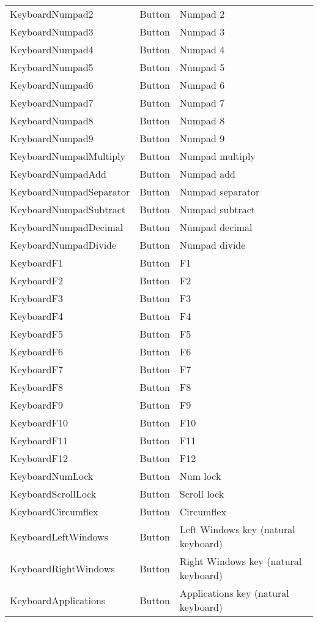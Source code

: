 \begin{center}
\begin{longtable}{ | l | l | p{9cm} |}
	KeyboardNumpad2				&	Button	&	Numpad 2\\
	KeyboardNumpad3				&	Button	&	Numpad 3\\
	KeyboardNumpad4				&	Button	&	Numpad 4\\
	KeyboardNumpad5				&	Button	&	Numpad 5\\
	KeyboardNumpad6				&	Button	&	Numpad 6\\
	KeyboardNumpad7				&	Button	&	Numpad 7\\
	KeyboardNumpad8				&	Button	&	Numpad 8\\
	KeyboardNumpad9				&	Button	&	Numpad 9\\
	KeyboardNumpadMultiply		&	Button	&	Numpad multiply\\
	KeyboardNumpadAdd			&	Button	&	Numpad add\\
	KeyboardNumpadSeparator		&	Button	&	Numpad separator\\
	KeyboardNumpadSubtract		&	Button	&	Numpad subtract\\
	KeyboardNumpadDecimal		&	Button	&	Numpad decimal\\
	KeyboardNumpadDivide		&	Button	&	Numpad divide\\
	KeyboardF1					&	Button	&	F1\\
	KeyboardF2					&	Button	&	F2\\
	KeyboardF3					&	Button	&	F3\\
	KeyboardF4					&	Button	&	F4\\
	KeyboardF5					&	Button	&	F5\\
	KeyboardF6					&	Button	&	F6\\
	KeyboardF7					&	Button	&	F7\\
	KeyboardF8					&	Button	&	F8\\
	KeyboardF9					&	Button	&	F9\\
	KeyboardF10					&	Button	&	F10\\
	KeyboardF11					&	Button	&	F11\\
	KeyboardF12					&	Button	&	F12\\
	KeyboardNumLock				&	Button	&	Num lock\\
	KeyboardScrollLock			&	Button	&	Scroll lock\\
	KeyboardCircumflex			&	Button	&	Circumflex\\
	KeyboardLeftWindows			&	Button	&	Left Windows key (natural keyboard)\\
	KeyboardRightWindows		&	Button	&	Right Windows key (natural keyboard)\\
	KeyboardApplications		&	Button	&	Applications key (natural keyboard)\\

\end{longtable}
\end{center}
